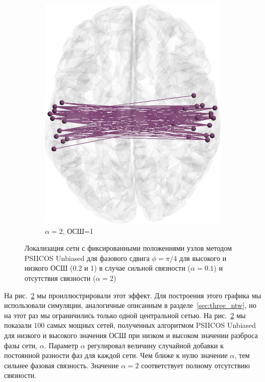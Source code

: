 \begin{figure}[htbp]
\begin{subfigure}[t]{0.24\textwidth}
        \includegraphics[width=0.99\linewidth]{../images/loreta_brain_jitter_2_snr_1_phase_lag_07854.jpg}
        \caption{$\alpha=2$, ОСШ=1}\label{fig:unbiased_1_ntw_d}
    \end{subfigure}
    \caption{Локализация сети с фиксированными положениями узлов методом PSIICOS Unbiased для
    фазового сдвига $\phi=\pi/4$ для высокого и низкого ОСШ (0.2 и 1) в
    случае сильной связности ($\alpha=0.1$) и отсутствия связности ($\alpha=2$)}\label{fig:unbiased_breaks_in_high_snr}
\end{figure}

На рис.~\ref{fig:unbiased_breaks_in_high_snr} мы проиллюстрировали этот эффект.
Для построения этого графика мы использовали симуляции, аналогичные описанным в
разделе~\ref{sec:three_ntw}, но на этот раз мы ограничились только одной
центральной сетью. На рис.~\ref{fig:unbiased_breaks_in_high_snr} мы показали
100 самых мощных сетей, полученных алгоритмом PSIICOS Unbiased для низкого и
высокого значения ОСШ при низком и высоком значении разброса фазы сети, $\alpha$.
Параметр $\alpha$ регулировал величину случайной добавки к постоянной
разности фаз для каждой сети. Чем ближе к нулю значение $\alpha$, тем сильнее
фазовая связность. Значение $\alpha=2$ соответствует полному отсутствию связности.

